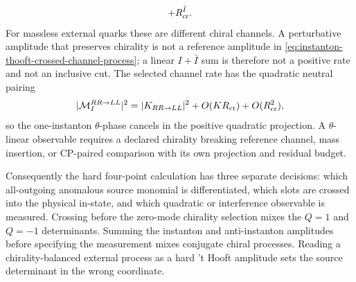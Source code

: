 \begin{controlledapproximation}
\[  +R_{\rm cr}^{\bar I}.
\]
For massless external quarks these are different chiral channels.  A
perturbative amplitude that preserves chirality is not a reference amplitude in
\eqref{eq:instanton-thooft-crossed-channel-process}; a linear
\(I+\bar I\) sum is therefore not a positive rate and not an inclusive cut.
The selected channel rate has the quadratic neutral pairing
\begin{equation}
  |\mathcal M_I^{R R\to L L}|^2
  =
  |K_{R R\to L L}|^2
  +O(KR_{\rm cr})+O(R_{\rm cr}^2),
  \label{eq:instanton-thooft-crossed-channel-rate}
\end{equation}
so the one-instanton \(\theta\)-phase cancels in the positive quadratic
projection.  A \(\theta\)-linear observable requires a declared chirality
breaking reference channel, mass insertion, or CP-paired comparison with its
own projection and residual budget.

Consequently the hard four-point calculation has three separate decisions:
which all-outgoing anomalous source monomial is differentiated, which slots
are crossed into the physical in-state, and which quadratic or interference
observable is measured.  Crossing before the zero-mode chirality selection
mixes the \(Q=1\) and \(Q=-1\) determinants.  Summing the instanton and
anti-instanton amplitudes before specifying the measurement mixes conjugate
chiral processes.  Reading a chirality-balanced external process as a hard
't Hooft amplitude sets the source determinant in the wrong coordinate.
\end{controlledapproximation}


